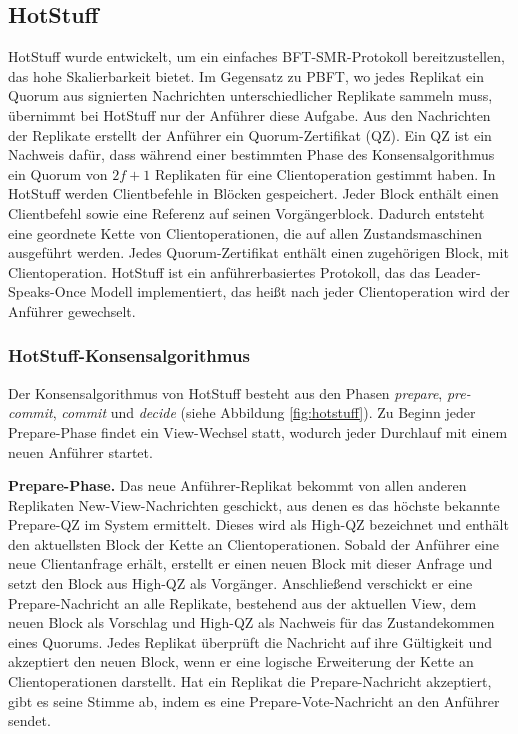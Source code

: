 \documentclass[nonacm,sigconf,natbib=false]{acmart}
\begin{document}
\subsection{HotStuff}

HotStuff\cite{hotstuff} wurde entwickelt, um ein einfaches BFT-SMR-Protokoll bereitzustellen, das hohe Skalierbarkeit bietet. Im Gegensatz zu PBFT, wo jedes Replikat ein Quorum aus signierten Nachrichten unterschiedlicher Replikate sammeln muss, übernimmt bei HotStuff nur der Anführer diese Aufgabe. Aus den Nachrichten der Replikate erstellt der Anführer ein Quorum-Zertifikat (QZ). Ein QZ ist ein Nachweis dafür, dass während einer bestimmten Phase des Konsensalgorithmus ein Quorum von $2f+1$ Replikaten für eine Clientoperation gestimmt haben. In HotStuff werden Clientbefehle in Blöcken gespeichert. Jeder Block enthält einen Clientbefehl sowie eine Referenz auf seinen Vorgängerblock. Dadurch entsteht eine geordnete Kette von Clientoperationen, die auf allen Zustandsmaschinen ausgeführt werden. Jedes Quorum-Zertifikat enthält einen zugehörigen Block, mit Clientoperation. HotStuff ist ein anführerbasiertes Protokoll, das das Leader-Speaks-Once Modell implementiert, das heißt nach jeder Clientoperation wird der Anführer gewechselt.

\subsubsection{HotStuff-Konsensalgorithmus}

Der Konsensalgorithmus von HotStuff besteht aus den Phasen \emph{prepare}, \emph{pre-commit}, \emph{commit} und \emph{decide} (siehe Abbildung \ref{fig:hotstuff}). Zu Beginn jeder Prepare-Phase findet ein View-Wechsel statt, wodurch jeder Durchlauf mit einem neuen Anführer startet.

\textbf{Prepare-Phase.} Das neue Anführer-Replikat bekommt von allen anderen Replikaten New-View-Nachrichten geschickt, aus denen es das höchste bekannte Prepare-QZ im System ermittelt. Dieses wird als High-QZ bezeichnet und enthält den aktuellsten Block der Kette an Clientoperationen. Sobald der Anführer eine neue Clientanfrage erhält, erstellt er einen neuen Block mit dieser Anfrage und setzt den Block aus High-QZ als Vorgänger. Anschließend verschickt er eine Prepare-Nachricht an alle Replikate, bestehend aus der aktuellen View, dem neuen Block als Vorschlag und High-QZ als Nachweis für das Zustandekommen eines Quorums. Jedes Replikat überprüft die Nachricht auf ihre Gültigkeit und akzeptiert den neuen Block, wenn er eine logische Erweiterung der Kette an Clientoperationen darstellt. Hat ein Replikat die Prepare-Nachricht akzeptiert, gibt es seine Stimme ab, indem es eine Prepare-Vote-Nachricht an den Anführer sendet.
\end{document}
